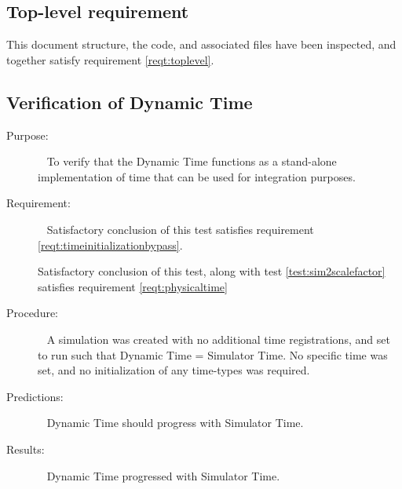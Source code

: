 %
%
%
%


\subsection{Top-level requirement}

\label{inspect:TLI}
 This document structure, the code, and associated files have been inspected,
 and together satisfy requirement \ref{reqt:toplevel}.

\subsection{Verification of Dynamic Time}
\label{test:1dynonly}
\begin{description}
\item[Purpose:]\ \newline
To verify that the Dynamic Time functions as a stand-alone implementation of
time that can be used for integration purposes.

\item[Requirement:]\ \newline
Satisfactory conclusion of this test satisfies requirement
\ref{reqt:timeinitializationbypass}.

Satisfactory conclusion of this test, along with test
\ref{test:sim2scalefactor} satisfies requirement \ref{reqt:physicaltime}

\item[Procedure:]\ \newline
A simulation was created with no additional time registrations, and set to run
such that Dynamic Time = Simulator Time.  No specific time was set, and no
initialization of any time-types was required.

\item[Predictions:]\ \newline
Dynamic Time should progress with Simulator Time.

\item[Results:]\ \newline
Dynamic Time progressed with Simulator Time.
\end{description}





